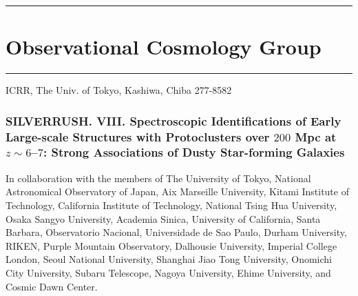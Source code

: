 %
%

\vspace{25pt}
\hrule
\section*{\bfsf Observational Cosmology Group} 
\vspace{12pt}
\hrule

\vspace{12pt}
\noindent
{}

\vspace{3pt}
\noindent
{\sf \small ICRR, The Univ. of Tokyo, Kashiwa, Chiba 277-8582}


\def\farcs{%
 \mbox{%
  \kern  0.13ex.%
  \kern -0.95ex\raisebox{.9ex}{\scriptsize$\prime\prime$}%
  \kern -0.1ex%
 }%
}



\subsubsection*{\bi
SILVERRUSH. VIII. 
Spectroscopic Identifications of Early Large-scale Structures with Protoclusters 
over $200$ Mpc at $z\sim6$--$7$: 
Strong Associations of Dusty Star-forming Galaxies
{\rm \cite{harikane2019}}
}

\vspace{3pt}

\noindent
In collaboration with the members of 
\noindent
The University of Tokyo, 
National Astronomical Observatory of Japan, 
Aix Marseille University, 
Kitami Institute of Technology, 
California Institute of Technology, 
National Tsing Hua University, 
Osaka Sangyo University, 
Academia Sinica, 
University of California, Santa Barbara, 
Observatorio Nacional, 
Universidade de Sao Paulo, 
Durham University, 
RIKEN, 
Purple Mountain Observatory, 
Dalhousie University, 
Imperial College London, 
Seoul National University, 
Shanghai Jiao Tong University, 
Onomichi City University, 
Subaru Telescope, 
Nagoya University, 
Ehime University, 
and 
Cosmic Dawn Center. 

\vspace{10pt}

